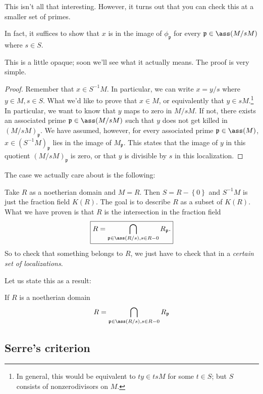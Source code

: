 This isn't all that interesting. However, it turns out that you can check this
at a smaller set of primes.

\begin{proposition} 
In fact, it suffices to show that $x$ is in the image of $\phi_{\mathfrak{p}}$
for every $\mathfrak{p} \in \ass(M/sM)$ where $s \in S$.
\end{proposition} 
This is a little opaque; soon we'll see what it actually means.
The proof is very simple.

\begin{proof} 
Remember that $ x \in S^{-1}M$. In particular, we can write $x = y/s$ where $y
\in M, s \in S$. What we'd like to prove that $x \in M$, or equivalently that
$y \in sM$.\footnote{In general, this would be equivalent to $ty \in tsM$ for
some $t \in S$; but $S$ consists of nonzerodivisors on $M$.}
In particular, we want to know that $y$ maps to zero in $M/sM$. If not, there
exists an associated prime $\mathfrak{p} \in \ass(M/sM)$ such that $y$ does not
get 
killed in $(M/sM)_{\mathfrak{p}}$. 
We have assumed, however, for every associated prime $\mathfrak{p}\in \ass(M)$, 
$x \in ( S^{-1}M)_{\mathfrak{p}}$ lies in the image of $M_{\mathfrak{p}}$. This
states that the image of $y$ in this quotient $(M/sM)_{\mathfrak{p}}$ is zero,
or that $y$ is divisible by $s$ in this localization.
\end{proof} 

The case we actually care about is the following:

Take $R$ as a noetherian domain and $M = R$.  Then $S = R - \left\{0\right\}$
and $S^{-1}M $ is just the fraction field $K(R)$.  The goal is to describe $R$
as a subset of $K(R)$. What we have proven is that $R$ is the intersection in
the fraction field 
\[ \boxed{ R = \bigcap_{\mathfrak{p} \in \ass(R/s), s \in R - 0}
R_{\mathfrak{p}} . }\]
So to check that something belongs to $R$, we just have to check that in a
\emph{certain set of localizations}.

Let us state this as a result:
\begin{theorem}
If $R$ is a noetherian domain
\[ R = \bigcap_{\mathfrak{p} \in \ass(R/s), s \in R - 0}
R_{\mathfrak{p}}  \]
\end{theorem} 

\subsection{Serre's criterion}

